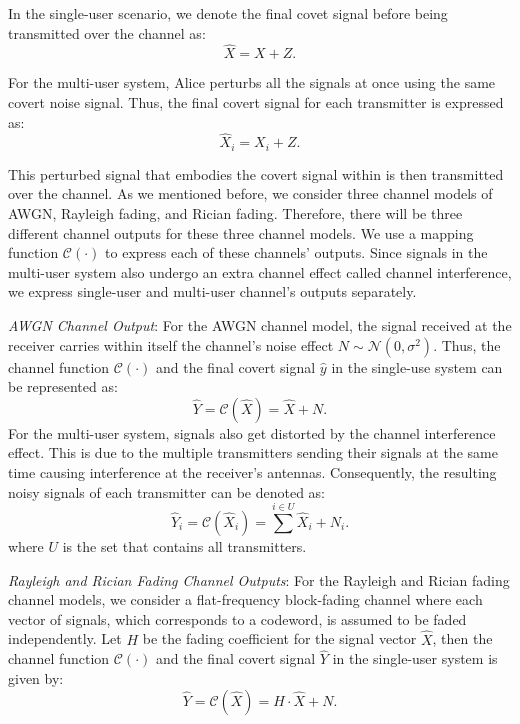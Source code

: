 In the single-user scenario, we denote the final covet signal before being transmitted over the channel as:
\begin{equation}
	\hat{X} = X + Z.
\end{equation}

For the multi-user system, Alice perturbs all the signals at once using the same covert noise signal. Thus, the final covert signal for each transmitter is expressed as:
\begin{equation}
	\hat{X}_i = X_i + Z.
\end{equation}

This perturbed signal that embodies the covert signal within is then transmitted over the channel. As we mentioned before, we consider three channel models of AWGN, Rayleigh fading, and Rician fading. Therefore, there will be three different channel outputs for these three channel models. We use a mapping function \(\mathcal{C}(\cdot)\) to express each of these channels' outputs. Since signals in the multi-user system also undergo an extra channel effect called channel interference, we express single-user and multi-user channel's outputs separately.


\textit{AWGN Channel Output}: For the AWGN channel model, the signal received at the receiver carries within itself the channel's noise effect \(N \sim \mathcal{N}(0, \sigma^2)\). Thus, the channel function \(\mathcal{C}(\cdot)\) and the final covert signal \(\hat{y}\) in the single-use system can be represented as:
\begin{equation}
	\hat{Y} = \mathcal{C}(\hat{X}) = \hat{X} + N.
\end{equation}
For the multi-user system, signals also get distorted by the channel interference effect. This is due to the multiple transmitters sending their signals at the same time causing interference at the receiver's antennas. Consequently, the resulting noisy signals of each transmitter can be denoted as:
\begin{equation}
	 \hat{Y}_i = \mathcal{C}(\hat{X}_i) = \sum^{i \in U}\hat{X}_i + N_i.
\end{equation}
where \(U\) is the set that contains all transmitters.

\textit{Rayleigh and Rician Fading Channel Outputs}: For the Rayleigh and Rician fading channel models, we consider a flat-frequency block-fading channel where each vector of signals, which corresponds to a codeword, is assumed to be faded independently. Let \(H\) be the fading coefficient for the signal vector \(\hat{X}\), then the channel function \(\mathcal{C}(\cdot)\) and the final covert signal \(\hat{Y}\) in the single-user system is given by:
\begin{equation}
	\hat{Y} = \mathcal{C}(\hat{X}) = H \cdot \hat{X} + N.
\end{equation}


